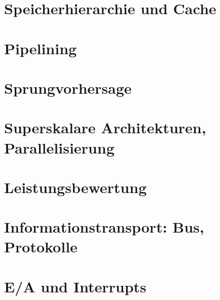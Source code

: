 \chapter{Speicherhierarchie und Cache}
%

\chapter{Pipelining}
%

\chapter{Sprungvorhersage}


\chapter{Superskalare Architekturen, Parallelisierung}

\chapter{Leistungsbewertung}

\chapter{Informationstransport: Bus, Protokolle}

\chapter{E/A und Interrupts}

%



